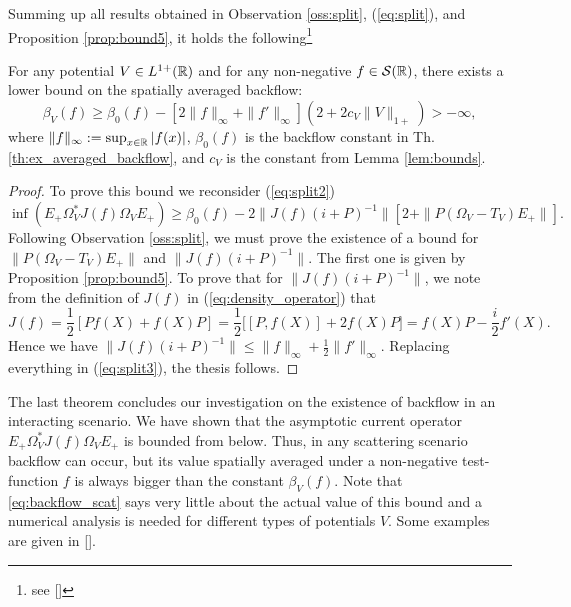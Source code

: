 Summing up all results obtained in Observation \ref{oss:split}, (\ref{eq:split}), and Proposition \ref{prop:bound5}, it holds the following\footnote{see [\citealp[Th. 3]{gand}]}
\begin{theorem}
	\label{th_backflow_scat}
	For any potential $V\in L^{1+}({\mathbb R})$ and for any non-negative $f\in\mathcal{S}({\mathbb R})$, there exists a lower bound on the spatially averaged backflow:
	\begin{equation}
		\beta_V(f)\ge\beta_0(f)-[2\|f\|_{\infty}+\|f'\|_{\infty}](2+2c_V\|V\|_{1+})>-\infty,
		\label{eq:backflow_scat}
	\end{equation}
	where $\|f\|_{\infty}:=\sup_{x\in{\mathbb R}}|f(x)|$, $\beta_0(f)$ is the backflow constant in Th. \ref{th:ex_averaged_backflow}, and $c_V$ is the constant from Lemma \ref{lem:bounds}.
\end{theorem}
\begin{proof}
	To prove this bound we reconsider (\ref{eq:split2})
	\begin{equation}
		\inf(E_+\Omega_V^*J(f)\Omega_VE_+)\ge \beta_0(f)-2\|J(f)(i+P)^{-1}\|[2+\|P(\Omega_V-T_V)E_+\|].
		\label{eq:split3}
	\end{equation}
	Following Observation \ref{oss:split}, we must prove the existence of a bound for $\|P(\Omega_V-T_V)E_+\|$ and $\|J(f)(i+P)^{-1}\|$. The first one is given by Proposition \ref{prop:bound5}. To prove that for $\|J(f)(i+P)^{-1}\|$, we note from the definition of $J(f)$ in (\ref{eq:density_operator}) that
	\begin{equation}
		J(f)=\frac{1}{2}[Pf(X)+f(X)P]=\frac{1}{2}\bigg[[P,f(X)]+2f(X)P\bigg]=f(X)P-\frac{i}{2}f'(X).
	\end{equation}
	Hence we have $\|J(f)(i+P)^{-1}\|\le \|f\|_{\infty}+\frac{1}{2}\|f'\|_{\infty}$. Replacing everything in (\ref{eq:split3}), the thesis follows.
\end{proof} 

The last theorem concludes our investigation on the existence of backflow in an interacting scenario. We have shown that the asymptotic current operator $E_+\Omega_V^*J(f)\Omega_VE_+$ is bounded from below. Thus, in any scattering scenario backflow can occur, but its value spatially averaged under a non-negative test-function $f$ is always bigger than the constant $\beta_V(f)$. Note that \eqref{eq:backflow_scat} says very little about the actual value of this bound and a numerical analysis is needed for different types of potentials $V$. Some examples are given in [\citealp[Sect. IV]{gand}].